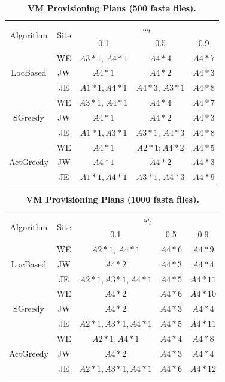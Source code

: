 \begin{table}[htbp]
\caption{\textbf{VM Provisioning Plans (500 fasta files). }} 
\label{tab:VMD2}
\begin{centering}
\captionsetup{justification=centering}
\begin{tabular}{|c|c|c|c|c|}
\hline 
\multirow{ 2}{*}{Algorithm} & \multirow{ 2}{*}{Site} & \multicolumn{3}{|c|}{$\omega_t$} \\
\cline{3-5}
& & 0.1 & 0.5 & 0.9 \tabularnewline
\hline 
\multirow{3}{*}{LocBased} & WE & $A3 * 1$, $A4 * 1$ & $A4 * 4$ & $A4 * 7$ \tabularnewline
& JW & $A4 * 1$ & $A4 * 2$ & $A4 * 3$ \tabularnewline
& JE & $A1 * 1, A4 * 1$ & $A4 * 3$, $A3 * 1$ & $A4 * 8$ \tabularnewline
\hline
\multirow{3}{*}{SGreedy} & WE & $A3 * 1$, $A4 * 1$ & $A4 * 4$ & $A4 * 7$ \tabularnewline
& JW & $A4 * 1$ & $A4 * 2$ & $A4 * 3$ \tabularnewline
& JE & $A1 * 1, A3 * 1$ & $A3 * 1$, $A4 * 3$ & $A4 * 8$ \tabularnewline
\hline 
\multirow{3}{*}{ActGreedy} & WE & $A4 * 1$ & $A2 * 1; A4 * 2$ & $A4 * 5$ \tabularnewline
& JW & $A4 * 1$ & $A4 * 2$ & $A4 * 3$ \tabularnewline
& JE & $A1 * 1, A4 * 1$ & $A3 * 1$, $A4 * 3$ & $A4 * 9$ \tabularnewline
\hline 
\end{tabular}
\par\end{centering} 
\end{table}

\begin{table}[htbp]
\caption{\textbf{VM Provisioning Plans (1000 fasta files). }} 
\label{tab:VMD3}
\begin{centering}
\captionsetup{justification=centering}
\begin{tabular}{|c|c|c|c|c|}
\hline 
\multirow{ 2}{*}{Algorithm} & \multirow{ 2}{*}{Site} & \multicolumn{3}{|c|}{$\omega_t$} \\
\cline{3-5}
& & 0.1 & 0.5 & 0.9 \tabularnewline
\hline  
\multirow{3}{*}{LocBased} & WE & $A2 * 1$, $A4 * 1$ & $A4 * 6$ & $A4 * 9$ \tabularnewline
& JW & $A4 * 2$ & $A4 * 3$ & $A4 * 4$ \tabularnewline
& JE & $A2 * 1, A3 * 1, A4 * 1$ & $A4 * 5$ & $A4 * 11$ \tabularnewline
\hline
\multirow{3}{*}{SGreedy} & WE & $A4 * 2$ & $A4 * 6$ & $A4 * 10$ \tabularnewline
& JW & $A4 * 2$ & $A4 * 3$ & $A4 * 4$ \tabularnewline
& JE & $A2 * 1, A3 * 1, A4 * 1$ & $A4 * 5$ & $A4 * 11$ \tabularnewline
\hline 
\multirow{3}{*}{ActGreedy} & WE & $A2 * 1, A4 * 1$ & $A4 * 4$ & $A4 * 8$ \tabularnewline
& JW & $A4 * 2$ & $A4 * 3$ & $A4 * 4$ \tabularnewline
& JE & $A2 * 1, A3 * 1, A4 * 1$ & $A4 * 6$ & $A4 * 12$ \tabularnewline
\hline 
\end{tabular}
\par\end{centering} 
\end{table}


